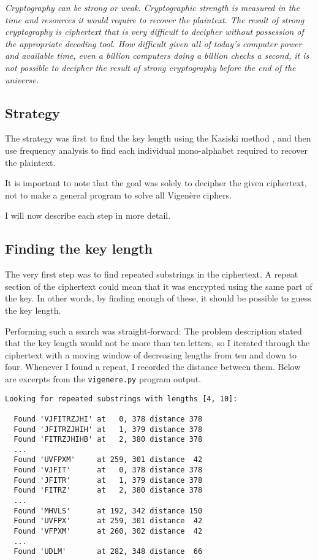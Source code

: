 \documentclass[a4paper,english,12pt]{article}
\begin{document}
\textit{Cryptography can be strong or weak. Cryptographic strength is measured
in the time and resources it would require to recover the plaintext.  The
result of strong cryptography is ciphertext that is very difficult to decipher
without possession of the appropriate decoding tool. How difficult given all of
today's computer power and available time, even a billion computers doing a
billion checks a second, it is not possible to decipher the result of strong
cryptography before the end of the universe.}

\subsection{Strategy}

The strategy was first to find the key length using the Kasiski method
\cite{dalkilic2000interactive, wiki:kasiski.examination}, and then use
frequency analysis to find each individual mono-alphabet required to recover
the plaintext.

It is important to note that the goal was solely to decipher the given
ciphertext, not to make a general program to solve all Vigenère ciphers.

I will now describe each step in more detail.

\subsection{Finding the key length}

The very first step was to find repeated substrings in the ciphertext. A repeat
section of the ciphertext could mean that it was encrypted using the same part
of the key. In other words, by finding enough of these, it should be possible
to guess the key length.

Performing such a search was straight-forward: The problem description stated
that the key length would not be more than ten letters, so I iterated through
the ciphertext with a moving window of decreasing lengths from ten and down to
four.  Whenever I found a repeat, I recorded the distance between them. Below
are excerpts from the \texttt{vigenere.py} program output.

\begin{verbatim}
Looking for repeated substrings with lengths [4, 10]:

  Found 'VJFITRZJHI' at   0, 378 distance 378
  Found 'JFITRZJHIH' at   1, 379 distance 378
  Found 'FITRZJHIHB' at   2, 380 distance 378
  ...
  Found 'UVFPXM'     at 259, 301 distance  42
  Found 'VJFIT'      at   0, 378 distance 378
  Found 'JFITR'      at   1, 379 distance 378
  Found 'FITRZ'      at   2, 380 distance 378
  ...
  Found 'MHVLS'      at 192, 342 distance 150
  Found 'UVFPX'      at 259, 301 distance  42
  Found 'VFPXM'      at 260, 302 distance  42
  ...
  Found 'UDLM'       at 282, 348 distance  66
\end{verbatim}
\end{document}
